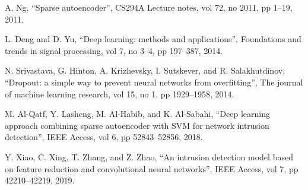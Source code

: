 \documentclass[conference]{IEEEtran}
\begin{document}
\begin{thebibliography}{00}
 A. Ng, “Sparse autoencoder”, CS294A Lecture notes, vol 72, no 2011, pp 1–19, 2011.

 L. Deng and D. Yu, “Deep learning: methods and applications”, Foundations and trends in signal processing, vol 7, no 3--4, pp 197–387, 2014.

 N. Srivastava, G. Hinton, A. Krizhevsky, I. Sutskever, and R. Salakhutdinov, “Dropout: a simple way to prevent neural networks from overfitting”, The journal of machine learning research, vol 15, no 1, pp 1929–1958, 2014.

 M. Al-Qatf, Y. Lasheng, M. Al-Habib, and K. Al-Sabahi, “Deep learning approach combining sparse autoencoder with SVM for network intrusion detection”, IEEE Access, vol 6, pp 52843–52856, 2018.

 Y. Xiao, C. Xing, T. Zhang, and Z. Zhao, “An intrusion detection model based on feature reduction and convolutional neural networks”, IEEE Access, vol 7, pp 42210–42219, 2019.




\end{thebibliography}
\end{document}
